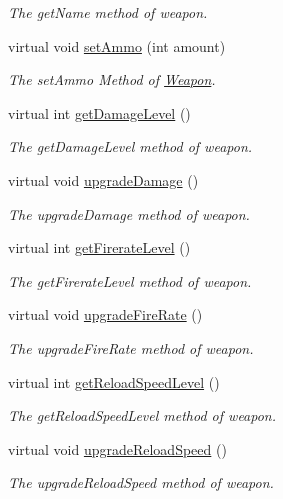 \begin{DoxyCompactItemize}
\begin{DoxyCompactList}\small\item\em The get\+Name method of weapon. \end{DoxyCompactList}\item 
virtual void \hyperlink{class_weapon_a06ca67c2d2f869c6a4fc7208d4ad56b5}{set\+Ammo} (int amount)
\begin{DoxyCompactList}\small\item\em The set\+Ammo Method of \hyperlink{class_weapon}{Weapon}. \end{DoxyCompactList}\item 
virtual int \hyperlink{class_weapon_adfa7cf4006b6089d3843081cfd46aaf2}{get\+Damage\+Level} ()
\begin{DoxyCompactList}\small\item\em The get\+Damage\+Level method of weapon. \end{DoxyCompactList}\item 
virtual void \hyperlink{class_weapon_a9419b6f263f0b78e0665678c9a14973a}{upgrade\+Damage} ()
\begin{DoxyCompactList}\small\item\em The upgrade\+Damage method of weapon. \end{DoxyCompactList}\item 
virtual int \hyperlink{class_weapon_a5ada13535926ce1445b8205f91085c39}{get\+Firerate\+Level} ()
\begin{DoxyCompactList}\small\item\em The get\+Firerate\+Level method of weapon. \end{DoxyCompactList}\item 
virtual void \hyperlink{class_weapon_aedc0a69ed6da65caf70e8ff2d81b1271}{upgrade\+Fire\+Rate} ()
\begin{DoxyCompactList}\small\item\em The upgrade\+Fire\+Rate method of weapon. \end{DoxyCompactList}\item 
virtual int \hyperlink{class_weapon_a188f89050bfb1b8ba94d5c6cb1527496}{get\+Reload\+Speed\+Level} ()
\begin{DoxyCompactList}\small\item\em The get\+Reload\+Speed\+Level method of weapon. \end{DoxyCompactList}\item 
virtual void \hyperlink{class_weapon_abd120b07bb75721966026445033d6601}{upgrade\+Reload\+Speed} ()
\begin{DoxyCompactList}\small\item\em The upgrade\+Reload\+Speed method of weapon. \end{DoxyCompactList}\item 

\end{DoxyCompactItemize}
